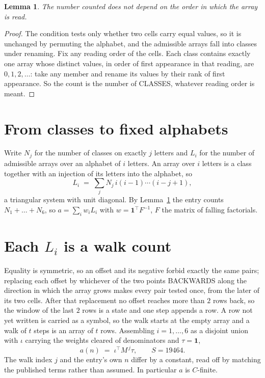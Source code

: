 \documentclass[11pt,a4paper]{article}
\theoremstyle{plain}
\newtheorem{lemma}[theorem]{Lemma}
\theoremstyle{definition}
\begin{document}
\begin{lemma}\label{lem:order}
The number counted does not depend on the order in which the array is read.
\end{lemma}

\begin{proof}
The condition tests only whether two cells carry equal values, so it is unchanged by permuting
the alphabet, and the admissible arrays fall into classes under renaming. Fix any reading order
of the cells. Each class contains exactly one array whose distinct values, in order of first
appearance in that reading, are $0,1,2,\dots$: take any member and rename its values by their
rank of first appearance. So the count is the number of CLASSES, whatever reading order is
meant.
\end{proof}

\section{From classes to fixed alphabets}

Write $N_j$ for the number of classes on exactly $j$ letters and $L_i$ for the number of
admissible arrays over an alphabet of $i$ letters. An array over $i$ letters is a class together
with an injection of its letters into the alphabet, so
\[
L_i\;=\;\sum_j N_j\,i(i-1)\cdots(i-j+1),
\]
a triangular system with unit diagonal. By Lemma~\ref{lem:order} the entry counts
$N_1+\dots+N_{6}$, so $a=\sum_i w_iL_i$ with $w=\mathbf{1}^{\!\top}F^{-1}$, $F$ the
matrix of falling factorials.

\section{Each $L_i$ is a walk count}

Equality is symmetric, so an offset and its negative forbid exactly the same pairs; replacing
each offset by whichever of the two points BACKWARDS along the direction in which the array
grows makes every pair tested once, from the later of its two cells. After that replacement no
offset reaches more than $2$ rows back, so the window of the last $2$
rows is a state and one step appends a row. A row not yet written is
carried as a symbol, so the walk starts at the empty array and a walk of $t$ steps is an array
of $t$ rows. Assembling $i=1,\dots,6$ as a disjoint union with $\iota$ carrying the
weights cleared of denominators and $\tau=\mathbf{1}$,
\[
a(n)\;=\;\iota^{\!\top}M^{\,j}\tau ,\qquad S=19464.
\]
The walk index $j$ and the entry's own $n$ differ by a constant, read off by matching the
published terms rather than assumed. In particular $a$ is $C$-finite.
\end{document}

